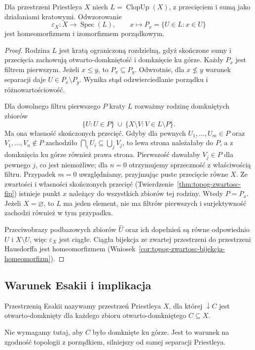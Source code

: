 \begin{twierdzenie}
\label{thm:ncl-heyting-priestley-recovery}
Dla przestrzeni Priestleya $X$ niech
$L=\operatorname{ClopUp}(X)$, z przecięciem
i sumą jako działaniami kratowymi.
Odwzorowanie
\[
 \varepsilon_X:X\longrightarrow\operatorname{Spec}(L),
 \qquad x\longmapsto P_x=\{U\in L:x\in U\}
\]
jest homeomorfizmem i izomorfizmem porządkowym.
\end{twierdzenie}
\begin{proof}
Rodzina $L$ jest kratą ograniczoną rozdzielną,
gdyż skończone sumy i przecięcia zachowują
otwarto-domkniętość i domknięcie ku górze.
Każdy $P_x$ jest filtrem pierwszym.
Jeżeli $x\leq y$, to $P_x\subseteq P_y$.
Odwrotnie, dla $x\not\leq y$ warunek separacji
daje $U\in P_x\setminus P_y$.
Wynika stąd odzwierciedlanie porządku
i różnowartościowość.

Dla dowolnego filtru pierwszego $P$ kraty $L$
rozważmy rodzinę domkniętych zbiorów
\[
 \{U:U\in P\}\ \cup\
 \{X\setminus V:V\in L\setminus P\}.
\]
Ma ona własność skończonych przecięć.
Gdyby dla pewnych $U_1,\ldots,U_m\in P$
oraz $V_1,\ldots,V_n\notin P$ zachodziło
$\bigcap_i U_i\subseteq\bigcup_j V_j$,
to lewa strona należałaby do $P$,
a z domknięcia ku górze również prawa strona.
Pierwszość dawałaby $V_j\in P$ dla pewnego $j$,
co jest niemożliwe; dla $n=0$ otrzymujemy
sprzeczność z właściwością filtru.
Przypadek $m=0$ uwzględniamy, przyjmując
puste przecięcie równe $X$.
Ze zwartości i własności skończonych przecięć
(Twierdzenie~\ref{thm:topog-zwartosc-fip})
istnieje punkt $x$ należący do wszystkich
zbiorów tej rodziny. Wtedy $P=P_x$.
Jeżeli $X=\varnothing$, to $L$ ma jeden element,
nie ma filtrów pierwszych i surjektywność
zachodzi również w tym przypadku.

Przeciwobrazy podbazowych zbiorów
$\widehat U$ oraz ich dopełnień są równe
odpowiednio $U$ i $X\setminus U$,
więc $\varepsilon_X$ jest ciągłe.
Ciągła bijekcja ze zwartej przestrzeni
do przestrzeni Hausdorffa jest homeomorfizmem
(Wniosek~\ref{cor:topog-zwartosc-bijekcja-homeomorfizm}).
\end{proof}

\subsection{Warunek Esakii i implikacja}

\begin{definicja}
\label{def:ncl-heyting-esakia}
Przestrzenią Esakii nazywamy przestrzeń Priestleya
$X$, dla której $\downarrow C$ jest
otwarto-domknięty dla każdego zbioru
otwarto-domkniętego $C\subseteq X$.
\end{definicja}
Nie wymagamy tutaj, aby $C$ było domknięte
ku górze. Jest to warunek na zgodność topologii
z porządkiem, silniejszy od samej separacji Priestleya.


